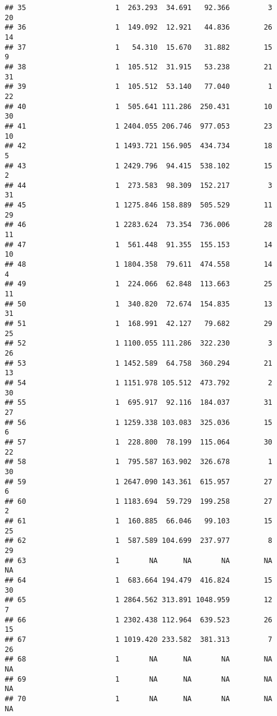 \documentclass[
]{article}
\begin{document}
\begin{verbatim}
## 35                     1  263.293  34.691   92.366         3        20
## 36                     1  149.092  12.921   44.836        26        14
## 37                     1   54.310  15.670   31.882        15         9
## 38                     1  105.512  31.915   53.238        21        31
## 39                     1  105.512  53.140   77.040         1        22
## 40                     1  505.641 111.286  250.431        10        30
## 41                     1 2404.055 206.746  977.053        23        10
## 42                     1 1493.721 156.905  434.734        18         5
## 43                     1 2429.796  94.415  538.102        15         2
## 44                     1  273.583  98.309  152.217         3        31
## 45                     1 1275.846 158.889  505.529        11        29
## 46                     1 2283.624  73.354  736.006        28        11
## 47                     1  561.448  91.355  155.153        14        10
## 48                     1 1804.358  79.611  474.558        14         4
## 49                     1  224.066  62.848  113.663        25        11
## 50                     1  340.820  72.674  154.835        13        31
## 51                     1  168.991  42.127   79.682        29        25
## 52                     1 1100.055 111.286  322.230         3        26
## 53                     1 1452.589  64.758  360.294        21        13
## 54                     1 1151.978 105.512  473.792         2        30
## 55                     1  695.917  92.116  184.037        31        27
## 56                     1 1259.338 103.083  325.036        15         6
## 57                     1  228.800  78.199  115.064        30        22
## 58                     1  795.587 163.902  326.678         1        30
## 59                     1 2647.090 143.361  615.957        27         6
## 60                     1 1183.694  59.729  199.258        27         2
## 61                     1  160.885  66.046   99.103        15        25
## 62                     1  587.589 104.699  237.977         8        29
## 63                     1       NA      NA       NA        NA        NA
## 64                     1  683.664 194.479  416.824        15        30
## 65                     1 2864.562 313.891 1048.959        12         7
## 66                     1 2302.438 112.964  639.523        26        15
## 67                     1 1019.420 233.582  381.313         7        26
## 68                     1       NA      NA       NA        NA        NA
## 69                     1       NA      NA       NA        NA        NA
## 70                     1       NA      NA       NA        NA        NA

\end{verbatim}
\end{document}
